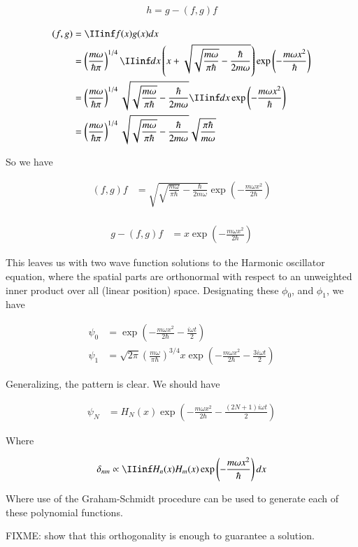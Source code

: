 \documentclass{article}
\begin{document}
\begin{align*}
h = g - (f,g) f
\end{align*}

\begin{align*}
(f,g)
&= \IIinf f(x) g(x) dx \\
&= 
\left( 
\frac{ m \omega }{\hbar \pi}
\right)^{1/4} 
\IIinf dx
\left(x + \sqrt{\sqrt{\frac{m \omega}{\pi \hbar}} - \frac{ \hbar}{ 2 m \omega} }\right) 
\exp\left( - \frac{m \omega x^2 }{\hbar} \right) \\
&= 
\left( 
\frac{ m \omega }{\hbar \pi}
\right)^{1/4} 
\sqrt{\sqrt{\frac{m \omega}{\pi \hbar}} - \frac{ \hbar}{ 2 m \omega} }
\IIinf dx
\exp\left( - \frac{m \omega x^2 }{\hbar} \right) \\
&= 
\left( 
\frac{ m \omega }{\hbar \pi}
\right)^{1/4} 
\sqrt{\sqrt{\frac{m \omega}{\pi \hbar}} - \frac{ \hbar}{ 2 m \omega} }
\sqrt{ \frac{\pi \hbar}{ m \omega} }
\end{align*}

So we have

\begin{align*}
(f,g) f 
&= 
\sqrt{\sqrt{\frac{m \omega}{\pi \hbar}} - \frac{ \hbar}{ 2 m \omega} }
\exp\left( - \frac{m \omega x^2 }{2 \hbar} \right) \\
\end{align*}

\begin{align*}
g - (f,g) f 
&= x \exp\left( - \frac{m \omega x^2}{2 \hbar} \right)
\end{align*}

This leaves us with two wave function solutions to the Harmonic oscillator equation, where the spatial parts are orthonormal with respect to an unweighted inner product
over all (linear position) space.  Designating these $\phi_0$, and $\phi_1$, we have

\begin{align*}
\psi_0 &= \exp\left( - \frac{m \omega x^2}{2 \hbar} - \frac{i \omega t }{ 2} \right) \\
\psi_1 &= \sqrt{2\pi} \left(\frac{m \omega}{\pi\hbar}\right)^{3/4} x \exp\left( - \frac{m \omega x^2}{2 \hbar} - \frac{3 i \omega t }{ 2} \right)
\end{align*}

Generalizing, the pattern is clear.  We should have

\begin{align*}
\psi_N &= H_N(x) \exp\left( - \frac{m \omega x^2}{2 \hbar} - \frac{(2N + 1) i \omega t }{ 2} \right)
\end{align*}

Where 

\begin{align*}
\delta_{nm} \propto \IIinf H_n(x) H_m(x) \exp\left( - \frac{m \omega x^2}{\hbar} \right) dx
\end{align*}

Where use of the Graham-Schmidt procedure can be used to generate each of these polynomial functions.

FIXME: show that this orthogonality is enough to guarantee a solution.



\end{document}
